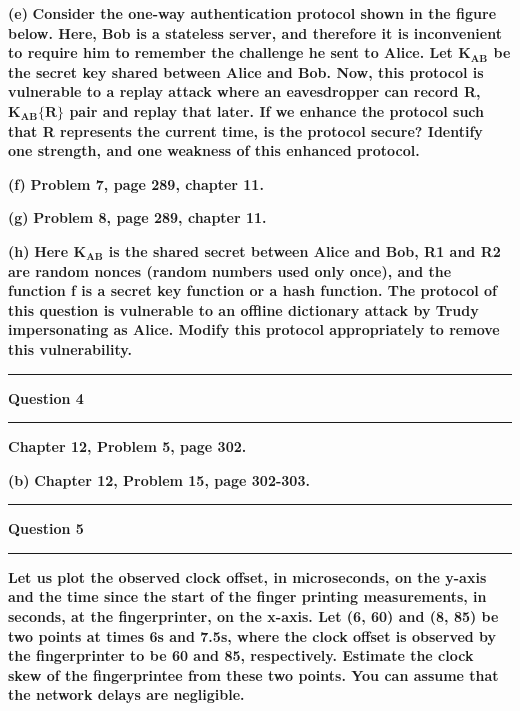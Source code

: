 \documentclass[11pt]{article}
\newcommand\question[2]{\vspace{.25in}\hrule\textbf{#1}\vspace{.5em}\hrule\vspace{.10in}}
\renewcommand\part[1]{\vspace{.10in}\textbf{(#1)}}
\begin{document}
\part{e} \textbf{Consider the one-way authentication protocol shown in the figure below. Here, Bob is a stateless server, and therefore it is inconvenient to require him to remember the challenge he sent to Alice. Let $\mathbf{K_{AB}}$ be the secret key shared between Alice and Bob. Now, this protocol is vulnerable to a replay attack where an eavesdropper can record R, $\mathbf{K_{AB}\{R\}}$ pair and replay that later. If we enhance the protocol such that R represents the current time, is the protocol secure? Identify one strength, and one weakness of this enhanced protocol.}

\part{f} \textbf{Problem 7, page 289, chapter 11.}

\part{g} \textbf{Problem 8, page 289, chapter 11.}

\part{h} \textbf{Here $\mathbf{K_{AB}}$ is the shared secret between Alice and Bob, R1 and R2 are random nonces (random numbers used only once), and the function f is a secret key function or a hash function. The protocol of this question is vulnerable to an offline dictionary attack by Trudy impersonating as Alice. Modify this protocol appropriately to remove this vulnerability.}

\question{Question 4}

\part{a} \textbf{Chapter 12, Problem 5, page 302.}

\part{b} \textbf{Chapter 12, Problem 15, page 302-303.}

\question{Question 5}

\part{a} \textbf{Let us plot the observed clock offset, in microseconds, on the y-axis and the time since the start of the finger printing measurements, in seconds, at the fingerprinter, on the x-axis. Let (6, 60) and (8, 85) be two points at times 6s and 7.5s, where the clock offset is observed by the fingerprinter to be 60 and 85, respectively. Estimate the clock skew of the fingerprintee from these two points. You can assume that the network delays are negligible.} 
\end{document}
